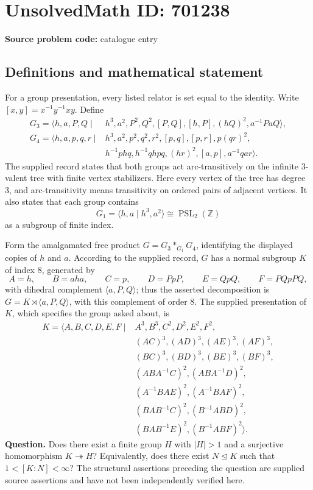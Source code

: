 \documentclass[11pt]{article}
\newcommand{\Z}{\mathbb{Z}}
\begin{document}
\section*{UnsolvedMath ID: 701238}
\textbf{Source problem code:} catalogue entry
\subsection{Definitions and mathematical statement}
For a group presentation, every listed relator is set equal to the identity. Write \([x,y]=x^{-1}y^{-1}xy\). Define
\[
\begin{aligned}
G_3=\langle h,a,P,Q\mid {}&h^3,a^2,P^2,Q^2,[P,Q],[h,P],(hQ)^2,a^{-1}PaQ\rangle,\\
G_4=\langle h,a,p,q,r\mid {}&h^3,a^2,p^2,q^2,r^2,[p,q],[p,r],p(qr)^2,\\
&h^{-1}phq,h^{-1}qhpq,(hr)^2,[a,p],a^{-1}qar\rangle.
\end{aligned}
\]
The supplied record states that both groups act arc-transitively on the infinite \(3\)-valent tree with finite vertex stabilizers. Here every vertex of the tree has degree \(3\), and arc-transitivity means transitivity on ordered pairs of adjacent vertices. It also states that each group contains
\[
G_1=\langle h,a\mid h^3,a^2\rangle\cong\operatorname{PSL}_2(\Z)
\]
as a subgroup of finite index.

Form the amalgamated free product \(G=G_3*_{G_1}G_4\), identifying the displayed copies of \(h\) and \(a\). According to the supplied record, \(G\) has a normal subgroup \(K\) of index \(8\), generated by
\[
A=h,\qquad B=aha,\qquad C=p,\qquad D=PpP,\qquad E=QpQ,\qquad F=PQpPQ,
\]
with dihedral complement \(\langle a,P,Q\rangle\); thus the asserted decomposition is \(G=K\rtimes\langle a,P,Q\rangle\), with this complement of order \(8\). The supplied presentation of \(K\), which specifies the group asked about, is
\[
\begin{aligned}
K=\langle A,B,C,D,E,F\mid {}&A^3,B^3,C^2,D^2,E^2,F^2,\\
&(AC)^3,(AD)^3,(AE)^3,(AF)^3,\\
&(BC)^3,(BD)^3,(BE)^3,(BF)^3,\\
&(ABA^{-1}C)^2,(ABA^{-1}D)^2,\\
&(A^{-1}BAE)^2,(A^{-1}BAF)^2,\\
&(BAB^{-1}C)^2,(B^{-1}ABD)^2,\\
&(BAB^{-1}E)^2,(B^{-1}ABF)^2\rangle.
\end{aligned}
\]
\textbf{Question.} Does there exist a finite group \(H\) with \(|H|>1\) and a surjective homomorphism \(K\twoheadrightarrow H\)? Equivalently, does there exist \(N\trianglelefteq K\) such that \(1<[K:N]<\infty\)? The structural assertions preceding the question are supplied source assertions and have not been independently verified here.
\end{document}
